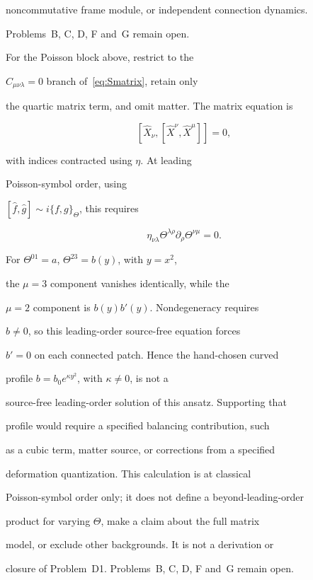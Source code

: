 noncommutative frame module, or independent connection dynamics.

Problems~B, C, D, F and~G remain open.



For the Poisson block above, restrict to the

\(C_{\mu\nu\lambda}=0\) branch of~\eqref{eq:Smatrix}, retain only

the quartic matrix term, and omit matter. The matrix equation is

\[

  [\hat X_\nu,[\hat X^\nu,\hat X^\mu]]=0,

\]

with indices contracted using \(\eta\). At leading

Poisson-symbol order, using

\([\hat f,\hat g]\sim i\{f,g\}_\Theta\), this requires

\[

  \eta_{\nu\lambda}\Theta^{\lambda\rho}

  \partial_\rho\Theta^{\nu\mu}=0.

\]

For \(\Theta^{01}=a\), \(\Theta^{23}=b(y)\), with \(y=x^2\),

the \(\mu=3\) component vanishes identically, while the

\(\mu=2\) component is \(b(y)b'(y)\). Nondegeneracy requires

\(b\ne0\), so this leading-order source-free equation forces

\(b'=0\) on each connected patch. Hence the hand-chosen curved

profile \(b=b_0e^{\kappa y^2}\), with \(\kappa\ne0\), is not a

source-free leading-order solution of this ansatz. Supporting that

profile would require a specified balancing contribution, such

as a cubic term, matter source, or corrections from a specified

deformation quantization. This calculation is at classical

Poisson-symbol order only; it does not define a beyond-leading-order

product for varying \(\Theta\), make a claim about the full matrix

model, or exclude other backgrounds. It is not a derivation or

closure of Problem~D1. Problems~B, C, D, F and~G remain open.



